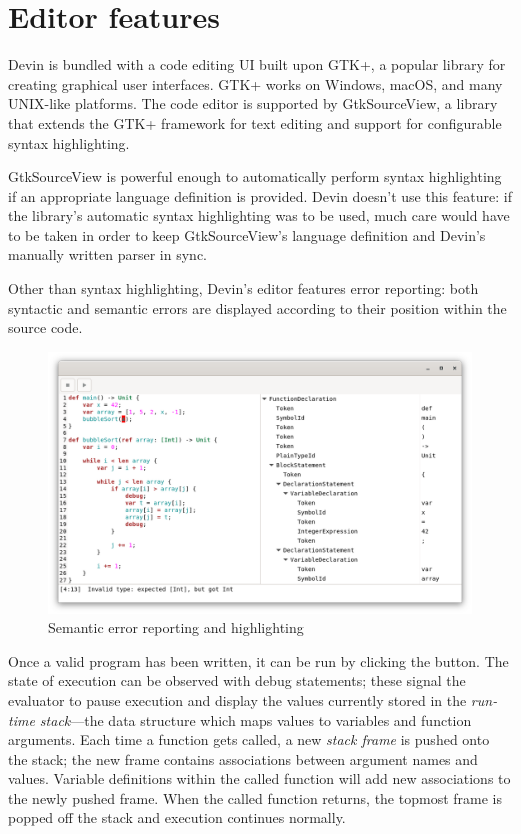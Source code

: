 \documentclass[11pt, american, draft]{PhdThesis}
\begin{document}
  \section{Editor features}

  Devin is bundled with a code editing UI built upon GTK+, a popular library for creating graphical
  user interfaces. GTK+ works on Windows, macOS, and many UNIX-like platforms\cite{gtk+}. The code
  editor is supported by GtkSourceView, a library that extends the GTK+ framework for text editing
  and support for configurable syntax highlighting\cite{gtksourceview}.

  GtkSourceView is powerful enough to automatically perform syntax highlighting if an appropriate
  language definition is provided. Devin doesn't use this feature: if the library's automatic
  syntax highlighting was to be used, much care would have to be taken in order to keep
  GtkSourceView's language definition and Devin's manually written parser in sync.

  Other than syntax highlighting, Devin's editor features error reporting: both syntactic and
  semantic errors are displayed according to their position within the source code.

  \begin{figure}[H]
    \center
    \includegraphics[width=0.9\linewidth]{4.png}
    \caption{Semantic error reporting and highlighting}
  \end{figure}

  Once a valid program has been written, it can be run by clicking the {\faPlay} button. The state
  of execution can be observed with debug statements; these signal the evaluator to pause execution
  and display the values currently stored in the \emph{run-time stack}---the data structure which
  maps values to variables and function arguments. Each time a function gets called, a new
  \emph{stack frame} is pushed onto the stack; the new frame contains associations between argument
  names and values. Variable definitions within the called function will add new associations to the
  newly pushed frame. When the called function returns, the topmost frame is popped off the stack
  and execution continues normally.
\end{document}
